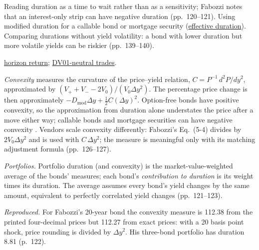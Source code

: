 \begin{qfmethod}
 Reading duration as a time to wait rather than as a sensitivity; Fabozzi notes that an interest-only strip can have negative duration (pp.~120--121). Using modified duration for a callable bond or mortgage security (\hyperref[meth:curve-based-empirical-duration]{effective duration}). Comparing durations without yield volatility: a bond with lower duration but more volatile yields can be riskier (pp.~139--140).

 \hyperref[meth:bond-return-decomposition]{horizon return}; \hyperref[meth:curve-trades-carry-rolldown]{DV01-neutral trades}.

\end{qfmethod}

\begin{qfmethod}\label{meth:convexity-portfolio-duration}
 \emph{Convexity} measures the curvature of the price--yield relation, $C=P^{-1}\,d^2P/dy^2$, approximated by $(V_++V_--2V_0)/(V_0\Delta y^2)$. The percentage price change is then approximately $-D_{\text{mod}}\Delta y+\tfrac12C(\Delta y)^2$. Option-free bonds have positive convexity, so the approximation from duration alone understates the price after a move either way; callable bonds and mortgage securities can have negative convexity \citep[chap.~5, pp.~124--128]{s7-fabozzifixed}. Vendors scale convexity differently: Fabozzi's Eq.~(5-4) divides by $2V_0\Delta y^2$ and is used with $C\,\Delta y^2$; the measure is meaningful only with its matching adjustment formula (pp.~126--127).

\emph{Portfolios.} Portfolio duration (and convexity) is the market-value-weighted average of the bonds' measures; each bond's \emph{contribution to duration} is its weight times its duration. The average assumes every bond's yield changes by the same amount, equivalent to perfectly correlated yield changes (pp.~121--123).

 \emph{Reproduced.} For Fabozzi's 20-year bond the convexity measure is 112.38 from the printed four-decimal prices but 112.27 from exact prices: with a 20 basis point shock, price rounding is divided by $\Delta y^2$. His three-bond portfolio has duration 8.81 (p.~122).


\end{qfmethod}
